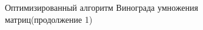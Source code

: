 \documentclass[a4paper,12pt]{report}
\begin{document}
\begin{figure}[ht!]
\caption{Оптимизированный алгоритм Винограда умножения матриц(продолжение 1)}
\end{figure}

\newpage
\end{document}

